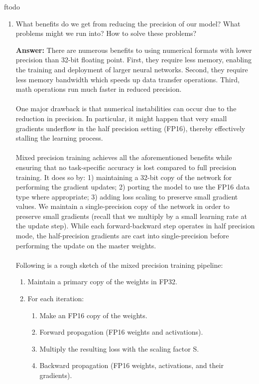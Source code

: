 ƒtodo\documentclass{article}
\newenvironment{QandA}{\begin{enumerate}[label=\arabic*.]}{\end{enumerate}}
\newenvironment{answer}{\par\normalfont \textbf{Answer:}}{}
\begin{document}
\begin{QandA}
    \item What benefits do we get from reducing the precision of our model? What problems might we run into? How to solve these problems?
    \begin{answer}
        There are numerous benefits to using numerical formats with lower precision than 32-bit floating point. First, they require less memory, enabling the training and deployment of larger neural networks. Second, they require less memory bandwidth which speeds up data transfer operations. Third, math operations run much faster in reduced precision.\\\\ 
        One major drawback is that numerical instabilities can occur due to the reduction in precision. In particular, it might happen that very small gradients underflow in the half precision setting (FP16), thereby effectively stalling the learning process. \\\\
        Mixed precision training achieves all the aforementioned benefits while ensuring that no task-specific accuracy is lost compared to full precision training. It does so by: 1) maintaining a 32-bit copy of the network for performing the gradient updates; 2) porting the model to use the FP16 data type where appropriate; 3) adding loss scaling to preserve small gradient values. We maintain a single-precision copy of the network in order to preserve small gradients (recall that we multiply by a small learning rate at the update step). While each forward-backward step operates in half precision mode, the half-precision gradients are cast into single-precision before performing the update on the master weights. \\\\
        Following is a rough sketch of the mixed precision training pipeline:
        \begin{enumerate}[label=\arabic*.]
            \item Maintain a primary copy of the weights in FP32. 
            \item For each iteration:
            \begin{enumerate}
                \item Make an FP16 copy of the weights.
                \item Forward propagation (FP16 weights and activations).
                \item Multiply the resulting loss with the scaling factor S.
                \item Backward propagation (FP16 weights, activations, and their gradients).

\end{enumerate}
\end{enumerate}
\end{answer}
\end{QandA}
\end{document}
